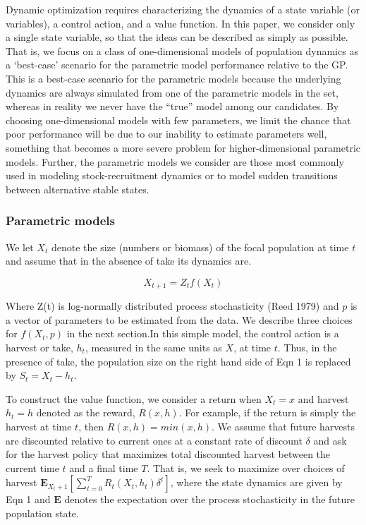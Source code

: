 \documentclass[author-year, 12pt,review]{components/elsarticle} %
\begin{document}
Dynamic optimization requires characterizing the dynamics of a state
variable (or variables), a control action, and a value function. In this
paper, we consider only a single state variable, so that the ideas can
be described as simply as possible. That is, we focus on a class of
one-dimensional models of population dynamics as a `best-case' scenario
for the parametric model performance relative to the GP. This is a
best-case scenario for the parametric models because the underlying
dynamics are always simulated from one of the parametric models in the
set, whereas in reality we never have the ``true'' model among our
candidates. By choosing one-dimensional models with few parameters, we
limit the chance that poor performance will be due to our inability to
estimate parameters well, something that becomes a more severe problem
for higher-dimensional parametric models. Further, the parametric models
we consider are those most commonly used in modeling stock-recruitment
dynamics or to model sudden transitions between alternative stable
states.

\subsubsection{Parametric models}\label{parametric-models}

We let $X_t$ denote the size (numbers or biomass) of the focal
population at time $t$ and assume that in the absence of take its
dynamics are.

\begin{equation}
X_{t+1}= Z_t f(X_t) \label{eq1} 
\end{equation}

Where Z(t) is log-normally distributed process stochasticity (Reed 1979)
and $p$ is a vector of parameters to be estimated from the data. We
describe three choices for $f(X_t,p)$ in the next section.In this simple
model, the control action is a harvest or take, $h_t$, measured in the
same units as $X$, at time $t$. Thus, in the presence of take, the
population size on the right hand side of Eqn 1 is replaced by
$S_t=X_t-h_t$.

To construct the value function, we consider a return when $X_t=x$ and
harvest $h_t=h$ denoted as the reward, $R(x,h)$. For example, if the
return is simply the harvest at time $t$, then $R(x,h)=min(x,h)$. We
assume that future harvests are discounted relative to current ones at a
constant rate of discount $\delta$ and ask for the harvest policy that
maximizes total discounted harvest between the current time $t$ and a
final time $T$. That is, we seek to maximize over choices of harvest
$\mathbf{E}_{X_t+1} [ \sum_{t = 0}^{T}  R_t(X_t, h_t) \delta^t]$, where
the state dynamics are given by Eqn 1 and $\mathbf{E}$ denotes the
expectation over the process stochasticity in the future population
state.
\end{document}
